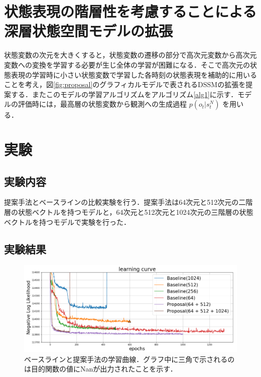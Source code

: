 \documentclass[10pt, twocolumn]{jarticle}
\begin{document}
\section{状態表現の階層性を考慮することによる\\深層状態空間モデルの拡張}
\label{chap:proposal}
状態変数の次元を大きくすると，状態変数の遷移の部分で高次元変数から高次元変数への変換を学習する必要が生じ全体の学習が困難になる．そこで高次元の状態表現の学習時に小さい状態変数で学習した各時刻の状態表現を補助的に用いることを考え，図\ref{fig:proposal}のグラフィカルモデルで表されるDSSMの拡張を提案する．またこのモデルの学習アルゴリズムをアルゴリズム\ref{alg1}に示す．モデルの評価時には，最高層の状態変数から観測への生成過程 $p(o_t|s^N_t)$ を用いる．

\section{実験}
\label{chap:experiment}

\subsection{実験内容}

提案手法とベースラインの比較実験を行う．提案手法は64次元と512次元の二階層の状態ベクトルを持つモデルと，64次元と512次元と1024次元の三階層の状態ベクトルを持つモデルで実験を行った．

\subsection{実験結果}

\begin{figure}[h]
    \begin{center}
        \includegraphics[width=\linewidth]{./figures/curve_yoko.png}
        \caption[提案手法の学習曲線]{\small ベースラインと提案手法の学習曲線．グラフ中に三角で示されるのは目的関数の値にNanが出力されたことを示す．}
        \label{fig:curve}
    \end{center}
    \end{figure}
\normalsize
\end{document}
